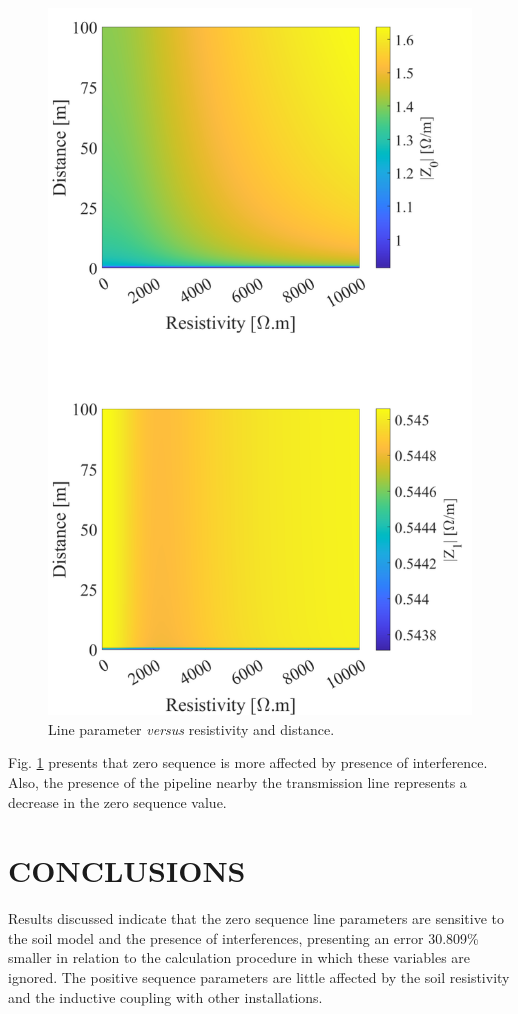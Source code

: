\documentclass[conference]{IEEEtran}
\begin{document}
\begin{figure}[hbt]
	\begin{center}
		\includegraphics[width=.8\columnwidth]{fig/Impedance.pdf}
		\caption{Line parameter \textit{versus} resistivity and distance.}
		\label{fig:Impedance}
	\end{center}
\end{figure}

Fig. \ref{fig:Impedance} presents that zero sequence is more affected by presence of interference. Also, the presence of the pipeline nearby the transmission line represents a decrease in the zero sequence value.

\section{CONCLUSIONS}

Results discussed indicate that the zero sequence line parameters are sensitive to the soil model and the presence of interferences, presenting an error 30.809\% smaller in relation to the calculation procedure in which these variables are ignored. The positive sequence parameters are little affected by the soil resistivity and the inductive coupling with other installations.
\end{document}
